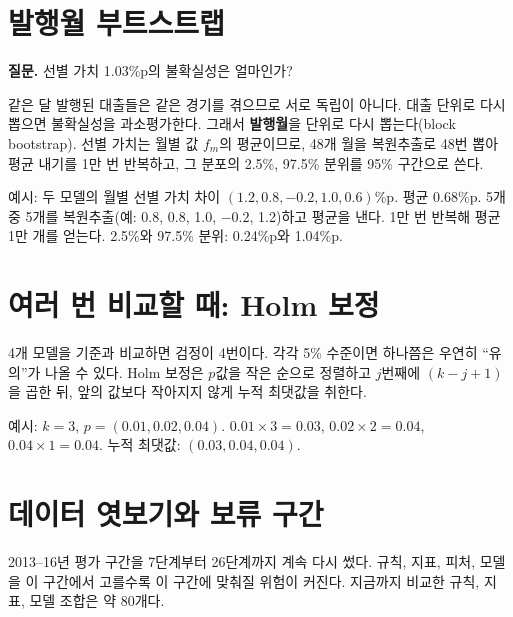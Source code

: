 \section{발행월 부트스트랩}
\textbf{질문.} 선별 가치 1.03\%p의 불확실성은 얼마인가?

같은 달 발행된 대출들은 같은 경기를 겪으므로 서로 독립이 아니다. 대출 단위로 다시 뽑으면 불확실성을 과소평가한다. 그래서 \textbf{발행월}을 단위로 다시 뽑는다(block bootstrap). 선별 가치는 월별 값 $f_m$의 평균이므로, 48개 월을 복원추출로 48번 뽑아 평균 내기를 1만 번 반복하고, 그 분포의 2.5\%, 97.5\% 분위를 95\% 구간으로 쓴다.

\begin{workout}[월별 차이 5개의 부트스트랩]
 예시: 두 모델의 월별 선별 가치 차이 $(1.2, 0.8, -0.2, 1.0, 0.6)$\%p. 평균 0.68\%p.
 5개 중 5개를 복원추출(예: 0.8, 0.8, 1.0, $-0.2$, 1.2)하고 평균을 낸다.
 1만 번 반복해 평균 1만 개를 얻는다. 
 2.5\%와 97.5\% 분위: 0.24\%p와 1.04\%p.
\end{workout}

\section{여러 번 비교할 때: Holm 보정}
4개 모델을 기준과 비교하면 검정이 4번이다. 각각 5\% 수준이면 하나쯤은 우연히 ``유의''가 나올 수 있다. Holm 보정은 $p$값을 작은 순으로 정렬하고 $j$번째에 $(k-j+1)$을 곱한 뒤, 앞의 값보다 작아지지 않게 누적 최댓값을 취한다.

\begin{workout}[Holm 보정]
 예시: $k=3$, $p=(0.01, 0.02, 0.04)$.
 $0.01\times3=0.03$, $0.02\times2=0.04$, $0.04\times1=0.04$.
 누적 최댓값: $(0.03, 0.04, 0.04)$.
\end{workout}

\section{데이터 엿보기와 보류 구간}
2013--16년 평가 구간을 7단계부터 26단계까지 계속 다시 썼다. 규칙, 지표, 피처, 모델을 이 구간에서 고를수록 이 구간에 맞춰질 위험이 커진다. 지금까지 비교한 규칙, 지표, 모델 조합은 약 80개다.

